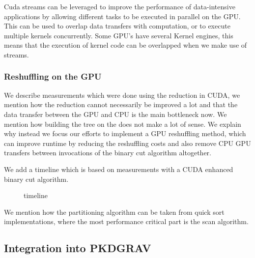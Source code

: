 \documentclass[]{article}
\begin{document}
Cuda streams can be leveraged to improve the performance of data-intensive applications by allowing different tasks to be executed in parallel on the GPU. This can be used to overlap data transfers with computation, or to execute multiple kernels concurrently. Some GPU's have several Kernel engines, this means that the execution of kernel code can be overlapped when we make use of streams.

\subsubsection{Reshuffling on the GPU}

We describe measurements which were done using the reduction in CUDA, we mention how the reduction cannot necessarily be improved a lot and that the data transfer between the GPU and CPU is the main bottleneck now. We mention how building the tree on the does not make a lot of sense. We explain why instead we focus our efforts to implement a GPU reshuffling method, which can improve runtime by reducing the reshuffling costs and also remove CPU GPU transfers between invocations of the binary cut algorithm altogether. 

We add a timeline which is based on measurements with a CUDA enhanced binary cut algorithm. 
\begin{figure}[H]
	\begin{center}
	\end{center}
	\caption{timeline}
	\label{u}
\end{figure}

We mention how the partitioning algorithm can be taken from quick sort implementations, where the most performance critical part is the scan algorithm. 
\newpage
\subsection{Integration into PKDGRAV}
\end{document}
